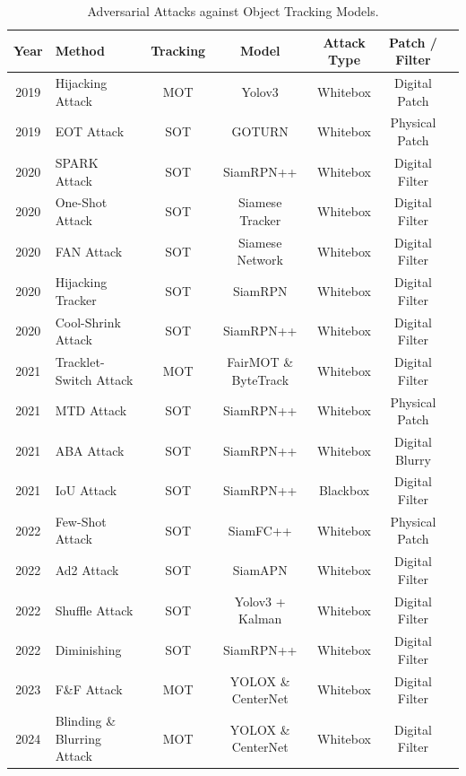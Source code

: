 \begin{table}
\centering
\begin{tabular}{ clccccc } 
\hline
Year & Method & Tracking & Model & Attack Type & Patch / Filter \\
\hline
2019 & Hijacking Attack \citep{jia2020fooling} & MOT & Yolov3 & Whitebox & Digital Patch \\
2019 & EOT Attack \citep{wiyatno2019physical} & SOT & GOTURN & Whitebox & Physical Patch \\
2020 & SPARK Attack \citep{guo2020spark} & SOT & SiamRPN++  & Whitebox & Digital Filter  \\
2020 & One-Shot Attack \citep{chen2020one} & SOT & Siamese Tracker  & Whitebox & Digital Filter \\
2020 & FAN Attack \citep{liang2020efficient} & SOT & Siamese Network & Whitebox & Digital Filter  \\
2020 & Hijacking Tracker \citep{yan2020hijacking}& SOT & SiamRPN & Whitebox & Digital Filter \\
2020 & Cool-Shrink Attack \citep{yan2020cooling} & SOT & SiamRPN++ & Whitebox & Digital Filter \\
2021 & Tracklet-Switch Attack \citep{lin2021tracklet} & MOT & FairMOT \& ByteTrack & Whitebox & Digital Filter \\
2021 & MTD Attack \citep{ding2021towards} & SOT & SiamRPN++  & Whitebox & Physical Patch \\
2021 & ABA Attack \citep{guo2021learning} & SOT & SiamRPN++ & Whitebox & Digital Blurry \\
2021 & IoU Attack \citep{jia2021iou} & SOT & SiamRPN++ & Blackbox & Digital Filter  \\
2022 & Few-Shot Attack \citep{li2022few} & SOT & SiamFC++  & Whitebox & Physical Patch\\
2022 & Ad2 Attack \citep{fu2022ad} & SOT & SiamAPN & Whitebox & Digital Filter \\
2022 & Shuffle Attack \citep{liu2022efficient} & SOT & Yolov3 + Kalman & Whitebox & Digital Filter  \\
2022 & Diminishing \citep{suttapak2022diminishing} & SOT & SiamRPN++ & Whitebox & Digital Filter    \\
2023 & F\&F Attack \citep{zhou2023f} & MOT & YOLOX \& CenterNet & Whitebox & Digital Filter  \\
2024 & Blinding \& Blurring Attack \citep{pang2024blinding} & MOT & YOLOX \& CenterNet & Whitebox & Digital Filter \\
\hline
\end{tabular}
\caption{Adversarial Attacks against Object Tracking Models.}
\label{tab.mot_attack}
\end{table}

